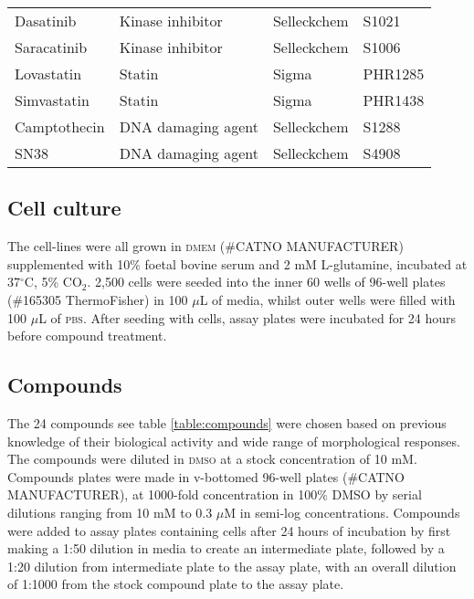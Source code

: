 \documentclass[a4paper,11pt,twoside,openright]{scrbook}
\begin{document}
\begin{table}[]
\begin{footnotesize}
\begin{tabular}{@{}llll@{}}
    Dasatinib       & Kinase inhibitor       & Selleckchem & S1021       \\
    Saracatinib     & Kinase inhibitor       & Selleckchem & S1006       \\
    Lovastatin      & Statin                 & Sigma       & PHR1285     \\
    Simvastatin     & Statin                 & Sigma       & PHR1438     \\
    Camptothecin    & DNA damaging agent     & Selleckchem & S1288       \\
    SN38            & DNA damaging agent     & Selleckchem & S4908       \\ \bottomrule
    \end{tabular}
    \end{footnotesize}
\end{table}



\subsection{Cell culture}
The cell-lines were all grown in \textsc{dmem} (\#CATNO MANUFACTURER) supplemented with 10\% foetal bovine serum and 2 mM L-glutamine, incubated at 37$^\circ$C, 5\% CO$_2$. 2,500 cells were seeded into the inner 60 wells of 96-well plates (\#165305 ThermoFisher) in 100 $\mu$L of media, whilst outer wells were filled with 100 $\mu$L of \textsc{pbs}.
After seeding with cells, assay plates were incubated for 24 hours before compound treatment.


\subsection{Compounds}
The 24 compounds see table \ref{table:compounds} were chosen based on previous knowledge of their biological activity and wide range of morphological responses.
The compounds were diluted in \textsc{dmso} at a stock concentration of 10 mM.
Compounds plates were made in v-bottomed 96-well plates (\#CATNO MANUFACTURER), at 1000-fold concentration in 100\% \textsc{DMSO} by serial dilutions ranging from 10 mM to 0.3 $\mu$M in semi-log concentrations.
Compounds were added to assay plates containing cells after 24 hours of incubation by first making a 1:50 dilution in media to create an intermediate plate, followed by a 1:20 dilution from intermediate plate to the assay plate, with an overall dilution of 1:1000 from the stock compound plate to the assay plate.
\end{document}

